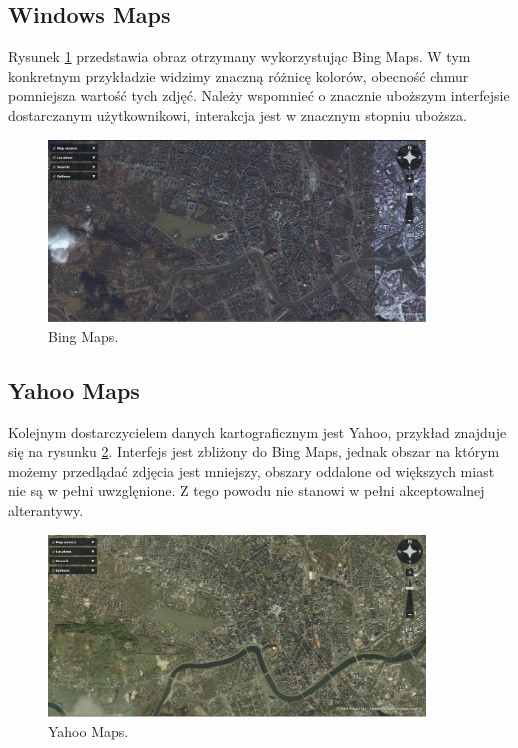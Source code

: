 \subsection{Windows Maps}
\label{subsec:Windows Maps}

Rysunek \ref{fig:bingMaps_1} przedstawia obraz otrzymany wykorzystując Bing Maps. W tym konkretnym przykładzie widzimy znaczną różnicę kolorów, obecność chmur pomniejsza wartość tych zdjęć. Należy wspomnieć o znacznie uboższym interfejsie dostarczanym użytkownikowi, interakcja jest w znacznym stopniu uboższa.

\begin{figure}[H]
  \centering
    \includegraphics[width=100mm]{ge/bing_1.jpg}
  \caption{Bing Maps.}
  \label{fig:bingMaps_1}
\end{figure}

\subsection{Yahoo Maps}
\label{subsec:Yahoo Maps}

Kolejnym dostarczycielem danych kartograficznym jest Yahoo, przykład znajduje się na rysunku \ref{fig:yahooMaps_1}. Interfejs jest zbliżony do Bing Maps, jednak obszar na którym możemy przedlądać zdjęcia jest mniejszy, obszary oddalone od większych miast nie są w pełni uwzglęnione. Z tego powodu nie stanowi w pełni akceptowalnej alterantywy.

\begin{figure}[H]
  \centering
    \includegraphics[width=100mm]{ge/yahoo_1.jpg}
  \caption{Yahoo Maps.}
  \label{fig:yahooMaps_1}
\end{figure}


